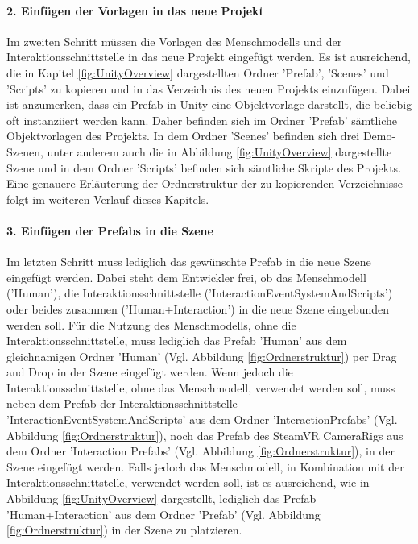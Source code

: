 \paragraph{2. Einfügen der Vorlagen in das neue Projekt}
\noindent Im zweiten Schritt müssen die Vorlagen des Menschmodells und der Interaktionsschnittstelle in das neue Projekt eingefügt werden. Es ist ausreichend, die in Kapitel \ref{fig:UnityOverview} dargestellten Ordner 'Prefab', 'Scenes' und 'Scripts' zu kopieren und in das Verzeichnis des neuen Projekts einzufügen. Dabei ist anzumerken, dass ein Prefab in Unity eine Objektvorlage darstellt, die beliebig oft instanziiert werden kann. Daher befinden sich im Ordner 'Prefab' sämtliche Objektvorlagen des Projekts. In dem Ordner 'Scenes' befinden sich drei Demo-Szenen, unter anderem auch die in Abbildung \ref{fig:UnityOverview} dargestellte Szene und in dem Ordner 'Scripts' befinden sich sämtliche Skripte des Projekts. Eine genauere Erläuterung der Ordnerstruktur der zu kopierenden Verzeichnisse folgt im weiteren Verlauf dieses Kapitels.

\paragraph{3. Einfügen der Prefabs in die Szene}	
\noindent Im letzten Schritt muss lediglich das gewünschte Prefab in die neue Szene eingefügt werden. Dabei steht dem Entwickler frei, ob das Menschmodell ('Human'), die Interaktionsschnittstelle ('InteractionEventSystemAndScripts') oder beides zusammen ('Human+Interaction') in die neue Szene eingebunden werden soll. Für die Nutzung des Menschmodells, ohne die Interaktionsschnittstelle, muss lediglich das Prefab 'Human' aus dem gleichnamigen Ordner 'Human' (Vgl. Abbildung \ref{fig:Ordnerstruktur}) per Drag and Drop in der Szene eingefügt werden. Wenn jedoch die Interaktionsschnittstelle, ohne das Menschmodell, verwendet werden soll, muss neben dem Prefab der Interaktionsschnittstelle 'InteractionEventSystemAndScripts' aus dem Ordner 'InteractionPrefabs' (Vgl. Abbildung \ref{fig:Ordnerstruktur}), noch das Prefab des SteamVR CameraRigs aus dem Ordner 'Interaction Prefabs' (Vgl. Abbildung \ref{fig:Ordnerstruktur}), in der Szene eingefügt werden. Falls jedoch das Menschmodell, in Kombination mit der Interaktionsschnittstelle, verwendet werden soll, ist es ausreichend, wie in Abbildung \ref{fig:UnityOverview} dargestellt, lediglich das Prefab 'Human+Interaction' aus dem Ordner 'Prefab' (Vgl. Abbildung \ref{fig:Ordnerstruktur}) in der Szene zu platzieren.

